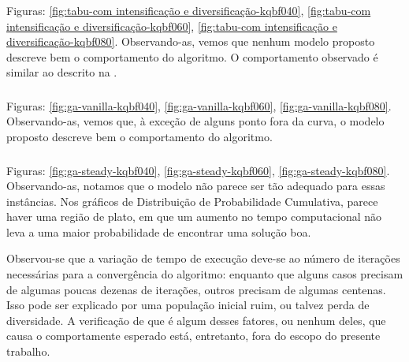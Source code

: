 \subsubsection{\tabuMod}
\label{subsubsection:ttt-validation-tabu-mod}

Figuras: \ref{fig:tabu-com intensificação e diversificação-kqbf040}, \ref{fig:tabu-com intensificação e diversificação-kqbf060},
\ref{fig:tabu-com intensificação e diversificação-kqbf080}. Observando-as, vemos que nenhum modelo proposto descreve bem o comportamento do algoritmo. O comportamento observado é similar ao descrito na .

\subsubsection{\geneticVanilla}
\label{subsubsection:ttt-validation-ga-vanilla}

Figuras: \ref{fig:ga-vanilla-kqbf040}, \ref{fig:ga-vanilla-kqbf060},
\ref{fig:ga-vanilla-kqbf080}. Observando-as, vemos que, à exceção de alguns ponto fora da curva, o modelo proposto descreve bem o comportamento do algoritmo.

\subsubsection{\geneticSteady}
\label{subsubsection:ttt-validation-ga-steady}

Figuras: \ref{fig:ga-steady-kqbf040}, \ref{fig:ga-steady-kqbf060},
\ref{fig:ga-steady-kqbf080}. Observando-as, notamos que o modelo não parece ser tão adequado para essas instâncias. Nos gráficos de Distribuição de Probabilidade Cumulativa, parece haver uma região de plato, em que um aumento no tempo computacional não leva a uma maior probabilidade de encontrar uma solução boa.

Observou-se que a variação de tempo de execução deve-se ao número de iterações necessárias para a convergência do algoritmo: enquanto que alguns casos precisam de algumas poucas dezenas de iterações, outros precisam de algumas centenas. Isso pode ser explicado por uma população inicial ruim, ou talvez perda de diversidade. A verificação de que é algum desses fatores, ou nenhum deles, que causa o comportamente esperado está, entretanto, fora do escopo do presente trabalho.
